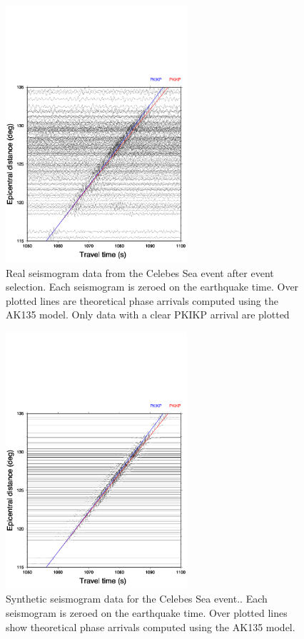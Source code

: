 \documentclass[11pt,a4paper]{article}
\begin{document}
\begin{figure}
	\centering
	\includegraphics[width=0.6\textwidth]{figures/celebessea/celebessea_real.pdf}
	\caption{Real seismogram data from the Celebes Sea event after event selection. Each seismogram is zeroed on the earthquake time. Over plotted lines are theoretical phase arrivals computed using the AK135 model. Only data with a clear PKIKP arrival are plotted}
	\label{fig:Real nonaligned}
\end{figure}

\begin{figure}
	\centering
	\includegraphics[width=0.6\textwidth]{figures/celebessea/celebessea_synthetic_both.pdf}
	\caption{Synthetic seismogram data for the Celebes Sea event.. Each seismogram is zeroed on the earthquake time. Over plotted lines show theoretical phase arrivals computed using the AK135 model.}
	\label{fig:Synth nonaligned}
\end{figure}
\end{document}
